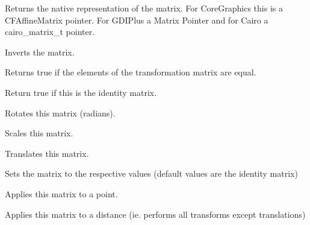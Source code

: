 
Returns the native representation of the matrix. For CoreGraphics this is a CFAffineMatrix pointer. For GDIPlus a Matrix Pointer and for Cairo a cairo\_matrix\_t pointer.

\label{wxgraphicsmatrixinvert}


Inverts the matrix.

\label{wxgraphicsmatrixisequal}


Returns true if the elements of the transformation matrix are equal.

\label{wxgraphicsmatrixisidentity}


Return true if this is the identity matrix.

\label{wxgraphicsmatrixrotate}


Rotates this matrix (radians).

\label{wxgraphicsmatrixscale}


Scales this matrix.

\label{wxgraphicsmatrixtranslate}


Translates this matrix.

\label{wxgraphicsmatrixset}


Sets the matrix to the respective values (default values are the identity matrix)

\label{wxgraphicsmatrixtransformpoint}


Applies this matrix to a point.

\label{wxgraphicsmatrixtransformdistance}


Applies this matrix to a distance (ie. performs all transforms except translations)



